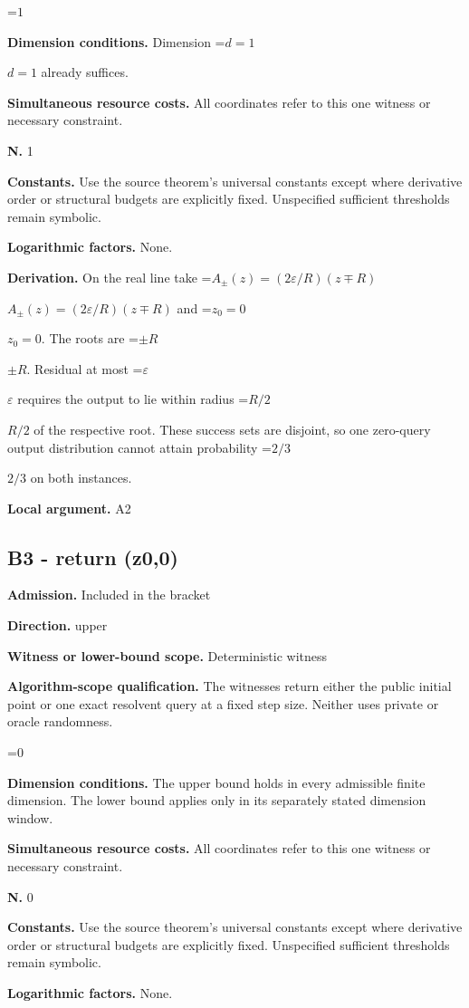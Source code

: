 \documentclass[10pt,a4paper]{article}
\newcommand{\AtlasMath}[1]{\par\begingroup\centering\setbox0=\hbox{$\displaystyle #1$}\ifdim\wd0>1.4\linewidth\typeout{ATLAS WIDE FORMULA: \the\wd0}\fi\ifdim\wd0>\linewidth\resizebox{\linewidth}{!}{\box0}\else\box0\fi\par\endgroup}
\newcommand{\AtlasInlineMath}[1]{\begingroup\setbox0=\hbox{$#1$}\ifdim\wd0>.4\linewidth\endgroup\AtlasMath{#1}\else\endgroup$#1$\fi}
\begin{document}
\AtlasMath{1}
\textbf{Dimension conditions.} Dimension \AtlasInlineMath{d=1} already suffices.

\textbf{Simultaneous resource costs.} All coordinates refer to this one witness or necessary constraint.

\textbf{N.} 1

\textbf{Constants.} Use the source theorem’s universal constants except where derivative order or structural budgets are explicitly fixed. Unspecified sufficient thresholds remain symbolic.

\textbf{Logarithmic factors.} None.

\textbf{Derivation.} On the real line take \AtlasInlineMath{A_\pm(z)=(2\varepsilon/R)(z\mp R)} and \AtlasInlineMath{z_0=0}. The roots are \AtlasInlineMath{\pm R}. Residual at most \AtlasInlineMath{\varepsilon} requires the output to lie within radius \AtlasInlineMath{R/2} of the respective root. These success sets are disjoint, so one zero-query output distribution cannot attain probability \AtlasInlineMath{2/3} on both instances.

\textbf{Local argument.} A2

\subsection{B3 - return (z0,0)}
\textbf{Admission.} Included in the bracket

\textbf{Direction.} upper

\textbf{Witness or lower-bound scope.} Deterministic witness

\textbf{Algorithm-scope qualification.} The witnesses return either the public initial point or one exact resolvent query at a fixed step size. Neither uses private or oracle randomness.

\AtlasMath{0}
\textbf{Dimension conditions.} The upper bound holds in every admissible finite dimension. The lower bound applies only in its separately stated dimension window.

\textbf{Simultaneous resource costs.} All coordinates refer to this one witness or necessary constraint.

\textbf{N.} 0

\textbf{Constants.} Use the source theorem’s universal constants except where derivative order or structural budgets are explicitly fixed. Unspecified sufficient thresholds remain symbolic.

\textbf{Logarithmic factors.} None.
\end{document}
